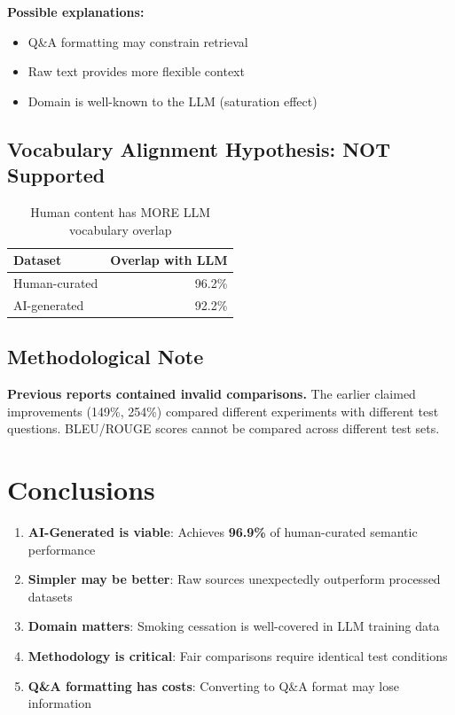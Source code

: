 \documentclass[11pt]{article}
\begin{document}
\noindent\textbf{Possible explanations:}
\begin{itemize}
    \item Q\&A formatting may constrain retrieval
    \item Raw text provides more flexible context
    \item Domain is well-known to the LLM (saturation effect)
\end{itemize}

\subsection{Vocabulary Alignment Hypothesis: NOT Supported}

\begin{table}[h]
\centering
\begin{tabular}{@{}lr@{}}
\toprule
\textbf{Dataset} & \textbf{Overlap with LLM} \\
\midrule
Human-curated & 96.2\% \\
AI-generated & 92.2\% \\
\bottomrule
\end{tabular}
\caption{Human content has MORE LLM vocabulary overlap}
\end{table}

\subsection{Methodological Note}

\textbf{Previous reports contained invalid comparisons.} The earlier claimed improvements (149\%, 254\%) compared different experiments with different test questions. BLEU/ROUGE scores cannot be compared across different test sets.

\section{Conclusions}

\begin{enumerate}
    \item \textbf{AI-Generated is viable}: Achieves \textbf{96.9\%} of human-curated semantic performance

    \item \textbf{Simpler may be better}: Raw sources unexpectedly outperform processed datasets

    \item \textbf{Domain matters}: Smoking cessation is well-covered in LLM training data

    \item \textbf{Methodology is critical}: Fair comparisons require identical test conditions

    \item \textbf{Q\&A formatting has costs}: Converting to Q\&A format may lose information
\end{enumerate}
\end{document}

